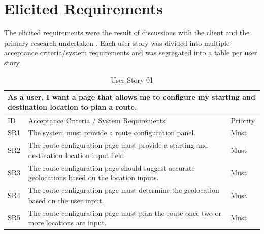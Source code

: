 \clearpage
\section{Elicited Requirements}
\label{requirements:user-stories}

The elicited requirements were the result of discussions with the client and the primary research undertaken . Each user story was divided into multiple acceptance criteria/system requirements and was segregated into a table per user story.

\begin{table}[!htb]
  \caption{User Story 01}
  \label{tab:user-story-01}
  \begin{tabular}{ m{1cm} m{11cm} m{1cm} }
  \hline
  \multicolumn{3}{p{13cm}}{As a user, I want a page that allows me to configure my starting and destination location to plan a route.}\\ 
  \hline
  ID & Acceptance Criteria / System Requirements & Priority\\
  \hline
  \label{SR:1}SR1 & The system must provide a route configuration panel. & Must \\
  \label{SR:2}SR2 & The route configuration page must provide a starting and destination location input field. & Must\\
  \label{SR:3}SR3 & The route configuration page should suggest accurate geolocations based on the location inputs. & Must\\ 
  \label{SR:4}SR4 & The route configuration page must determine the geolocation based on the user input. & Must\\ 
  \label{SR:5}SR5 & The route configuration page must plan the route once two or more locations are input. & Must\\ 
  \hline
  \end{tabular}
\end{table}

